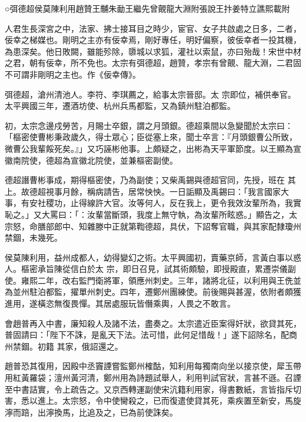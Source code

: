 
\begin{pinyinscope}

 ○弭德超侯莫陳利用趙贊王黼朱勔王繼先曾覿龍大淵附張說王抃姜特立譙熙載附



 人君生長深宮之中，法家、拂士接耳目之時少，宦官、女子共啟處之日多，二者，佞幸之梯媒也。剛明之主亦有佞幸焉，剛好專任，明好偏察，彼佞幸者一投其機，為患深矣。他日敗闕，雖能殄除，隳城以求狐，灌社以索鼠，亦曰殆哉！宋世中材之君，朝有佞幸，所不免也。太宗有弭德超，趙贊，孝宗有曾覿、龍大淵，二君固不可謂非剛明之主也。作《佞幸傳》。



 弭德超，滄州清池人。李符、李琪薦之，給事太宗晉邸。太
 宗即位，補供奉官。太平興國三年，遷酒坊使、杭州兵馬都監，又為鎮州駐泊都監。



 初，太宗念邊戍勞苦，月賜士卒銀，謂之月頭銀。德超乘間以急變聞於太宗曰：「樞密使曹彬秉政歲久，得士眾心；臣從塞上來，聞士卒言：『月頭銀曹公所致，微曹公我輩餒死矣。』」又巧誣彬他事。上頗疑之，出彬為天平軍節度。以王顯為宣徽南院使，德超為宣徽北院使，並兼樞密副使。



 德超譖曹彬事成，期得樞密使，乃為副使；又柴禹錫與德超官同，先授，班在
 其上。故德超視事月餘，稱病請告，居常怏怏。一日詬顯及禹錫曰：「我言國家大事，有安社稷功，止得線許大官。汝等何人，反在我上，更令我效汝輩所為，我實恥之。」又大罵曰：「：汝輩當斷頭，我度上無守執，為汝輩所眩惑。」顯告之，太宗怒，命膳部郎中、知雜滕中正就第鞫德超，具伏，下詔奪官職，與其家配隸瓊州禁錮，未幾死。



 侯莫陳利用，益州成都人，幼得變幻之術。太平興國初，賣藥京師，言黃白事以惑人。樞密承旨陳從信白於太
 宗，即日召見，試其術頗驗，即授殿直，累遷崇儀副使。雍熙二年，改右監門衛將軍，領應州刺史。三年，諸將北征，以利用與王侁並為並州駐泊都監，擢單州刺史。四年，遷鄭州團練使。前後賜與甚渥，依附者頗獲進用，遂橫恣無復畏憚。其居處服玩皆僭乘輿，人畏之不敢言。



 會趙普再入中書，廉知殺人及諸不法，盡奏之。太宗遣近臣案得奸狀，欲貸其死，普固請曰：「陛下不誅，是亂天下法。法可惜，此何足惜哉！」遂下詔除名，配商州禁錮。初籍
 其家，俄詔還之。



 趙普恐其復用，因殿中丞竇諲嘗監鄭州榷酤，知利用每獨南向坐以接京使，犀玉帶用紅黃羅袋；澶州黃河清，鄭州用為詩題試舉人，利用判試官狀，言甚不遜。召諲至中書詰實，令上疏告之。又京西轉運副使宋沆籍利用家，得書數紙，言皆指斥切害，悉以進上。太宗怒，令中使臠殺之，已而復遣使貸其死，乘疾置至新安，馬旋濘而踣，出濘換馬，比追及之，已為前使誅矣。




\end{pinyinscope}
